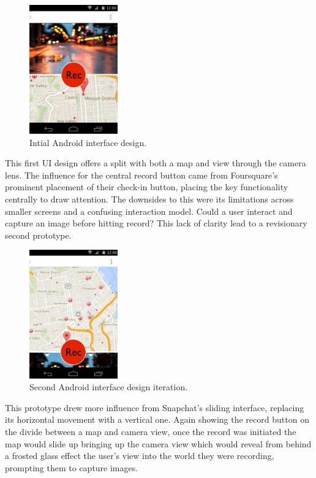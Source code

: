 \documentclass{l3proj}
\begin{document}
\begin{figure}[ht!]
\centering
\includegraphics[width=0.34\textwidth]{images/android-digital-prototype-1.jpg}
\caption{Intial Android interface design.}
\end{figure}

This first UI design offers a split with both a map and view through the camera lens. The influence for the central record button came from Foursquare’s prominent placement of their check-in button, placing the key functionality centrally to draw attention. The downsides to this were its limitations across smaller screens and a confusing interaction model. Could a user interact and capture an image before hitting record? This lack of clarity lead to a revisionary second prototype.

\begin{figure}[ht!]
\centering
\includegraphics[width=0.34\textwidth]{images/android-digital-prototype-2.jpg}
\caption{Second Android interface design iteration.}
\end{figure}

This prototype drew more influence from Snapchat’s sliding interface, replacing its horizontal movement with a vertical one. Again showing the record button on the divide between a map and camera view, once the record was initiated the map would slide up bringing up the camera view which would reveal from behind a frosted glass effect the user's view into the world they were recording, prompting them to capture images.
\end{document}

